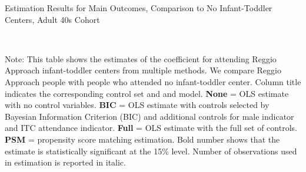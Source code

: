 \begin{table}[H] \caption{Estimation Results for Main Outcomes, Comparison to No Infant-Toddler Centers, Adult 40s Cohort} \label{ols-M-adult40-reg-nopres-asilo}
\scalebox{0.75}{}
\vspace{1ex} \\
\footnotesize\raggedright{Note: This table shows the estimates of the coefficient for attending Reggio Approach infant-toddler centers from multiple methods. We compare Reggio Approach people with people who attended no infant-toddler center. Column title indicates the corresponding control set and and model.  \textbf{None} = OLS estimate with no control variables. \textbf{BIC} = OLS estimate with controls selected by Bayesian Information Criterion (BIC) and additional controls for male indicator and ITC attendance indicator. \textbf{Full} = OLS estimate with the full set of controls. \textbf{PSM} =  propensity score matching estimation. Bold number shows that the estimate is statistically significant at the 15\% level. Number of observations used in estimation is reported in italic.}
\end{table}








